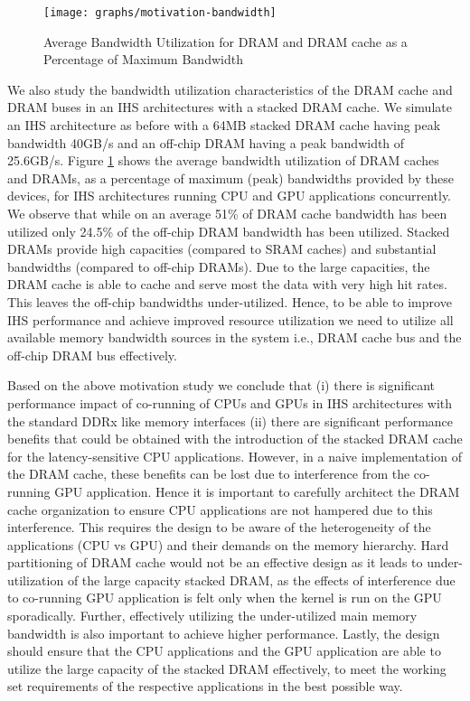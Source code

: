 \begin{figure}[htb]
	\centering

	\texttt{[image: graphs/motivation-bandwidth]}
	\caption{Average Bandwidth Utilization for DRAM and DRAM cache as a Percentage of Maximum Bandwidth}
	\label{fig:motivation-banwdidth}
\end{figure}

\par We also study the bandwidth utilization characteristics of the DRAM cache and DRAM buses in an IHS architectures with a stacked DRAM cache. We simulate an IHS architecture as before with a 64MB stacked DRAM cache having peak bandwidth 40GB/s and an off-chip DRAM having a peak bandwidth of 25.6GB/s. Figure \ref{fig:motivation-banwdidth} shows the average bandwidth utilization of DRAM caches and DRAMs, as a percentage of maximum (peak) bandwidths provided by these devices, for IHS architectures running CPU and GPU applications concurrently. We observe that while on an average 51\% of DRAM cache bandwidth has been utilized only 24.5\% of the off-chip DRAM bandwidth has been utilized. Stacked DRAMs provide high capacities (compared to SRAM caches) and substantial bandwidths (compared to off-chip DRAMs). Due to the large capacities, the DRAM cache is able to cache and serve most the data with very high hit rates. This leaves the off-chip bandwidths under-utilized. Hence, to be able to improve IHS performance and achieve improved resource utilization we need to utilize all available memory bandwidth sources in the system i.e., DRAM cache bus and the off-chip DRAM bus effectively.

\par Based on the above motivation study we conclude that (i) there is significant performance impact of co-running of CPUs and GPUs in IHS architectures with the standard DDRx like memory interfaces (ii) there are significant performance benefits that could be obtained 
with the introduction of the stacked DRAM cache for the latency-sensitive CPU applications. However, in a naive implementation
of the DRAM cache, these benefits can be lost due to interference from the co-running GPU application.  Hence it is important to carefully 
architect the DRAM cache organization to ensure CPU applications are not hampered due to this interference.
This requires the design to be aware of the heterogeneity of the applications (CPU vs GPU) and their demands on the 
memory hierarchy.  Hard partitioning of DRAM cache would not be an effective design as it leads to under-utilization of the large capacity 
stacked DRAM, as the effects of interference due to co-running GPU application is felt only when the kernel is run on the GPU sporadically. 
Further, effectively utilizing the under-utilized main memory bandwidth \cite{micro-refresh, mainak-hpca, bear}
is also important to achieve higher performance.  Lastly, the design should ensure that the CPU applications and the 
GPU application are able to utilize the large capacity of the stacked DRAM effectively, to meet the working set 
requirements of the respective applications in the best possible way.

